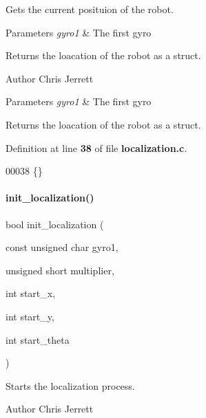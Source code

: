 Gets the current posituion of the robot. 


\begin{DoxyParams}{Parameters}
{\em gyro1} & The first gyro \\
\hline
\end{DoxyParams}
\begin{DoxyReturn}{Returns}
the loacation of the robot as a struct.
\end{DoxyReturn}
\begin{DoxyAuthor}{Author}
Chris Jerrett 
\end{DoxyAuthor}

\begin{DoxyParams}{Parameters}
{\em gyro1} & The first gyro \\
\hline
\end{DoxyParams}
\begin{DoxyReturn}{Returns}
the loacation of the robot as a struct. 
\end{DoxyReturn}


Definition at line \textbf{ 38} of file \textbf{ localization.\+c}.


\begin{DoxyCode}
00038 \{\}
\end{DoxyCode}
\mbox{\label{localization_8h_afdd0147de6aa15957e9a125f9cd20578}} 
\paragraph{init\+\_\+localization()}
{\footnotesize\ttfamily bool init\+\_\+localization (\begin{DoxyParamCaption}\item[{const unsigned char}]{gyro1,  }\item[{unsigned short}]{multiplier,  }\item[{int}]{start\+\_\+x,  }\item[{int}]{start\+\_\+y,  }\item[{int}]{start\+\_\+theta }\end{DoxyParamCaption})}



Starts the localization process. 

\begin{DoxyAuthor}{Author}
Chris Jerrett
\end{DoxyAuthor}

